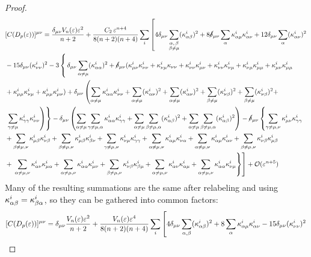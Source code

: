 \documentclass[letterpaper, reqno, 11pt]{amsart}
\theoremstyle{definition}
\theoremstyle{remark}
\numberwithin{equation}{section}
\begin{document}
\begin{proof}
\begin{align*}
& [C(D_p(\varepsilon))]^{\mu\nu} =\frac{ \delta_{\mu\nu}V_n(\varepsilon)\varepsilon^2}{n+2} + \frac{C_2\,\varepsilon^{n+4}}{8(n+2)(n+4)} \sum_{i}\left[4\delta_{\mu\nu}\sum_{\substack{\alpha,\,\beta \\ \beta\neq\mu}}(\kappa^i_{\alpha\beta})^2 + 8\cancel{\delta}_{\mu\nu}\sum_{\alpha}\kappa^i_{\alpha\mu}\kappa^i_{\alpha\nu} + 12\delta_{\mu\nu}\sum_{\alpha}(\kappa^i_{\alpha\nu})^2  \right. \\
& -15\delta_{\mu\nu}(\kappa^i_{\nu\nu})^2 -3\left\{\,\delta_{\mu\nu}\sum_{\alpha\neq\mu}(\kappa^i_{\alpha\alpha})^2 +\cancel{\delta}_{\mu\nu}( \kappa^i_{\mu\nu}\kappa^i_{\nu\nu} + \kappa^i_{\nu\mu}\kappa_{\nu\nu}+\kappa^i_{\nu\nu}\kappa^i_{\mu\nu} + \kappa^i_{\nu\nu}\kappa^i_{\nu\mu} + \kappa^i_{\nu\mu}\kappa^i_{\mu\mu} + \kappa^i_{\mu\nu}\kappa^i_{\mu\mu} \right. \\
& + \kappa^i_{\mu\mu}\kappa^i_{\nu\mu} + \kappa^i_{\mu\mu}\kappa^i_{\mu\nu} ) +\delta_{\mu\nu}\left( \sum_{\alpha\neq\mu}\kappa^i_{\alpha\alpha}\kappa^i_{\nu\nu} + \sum_{\alpha\neq\mu}(\kappa^i_{\alpha\nu})^2 +\sum_{\alpha\neq\mu}(\kappa^i_{\alpha\nu})^2 + \sum_{\beta\neq\mu}(\kappa^i_{\nu\beta})^2 + \sum_{\beta\neq\mu}(\kappa^i_{\nu\beta})^2+ \right. \\
& \left.\left. \sum_{\gamma\neq\mu}\kappa^i_{\gamma\gamma}\kappa^i_{\nu\nu}\right)\right\} - \delta_{\mu\nu}\left( \sum_{\alpha\neq\mu}\sum_{\gamma\neq\mu,\alpha}\kappa^i_{\alpha\alpha}\kappa^i_{\gamma\gamma} + \sum_{\alpha\neq\mu}\sum_{\beta\neq\mu,\alpha}(\kappa^i_{\alpha\beta})^2 + \sum_{\alpha\neq\mu}\sum_{\beta\neq\mu,\alpha}(\kappa^i_{\alpha\beta})^2  \right) - \cancel{\delta}_{\mu\nu}\left\{ \sum_{\gamma\neq\mu,\nu}\kappa^i_{\mu\nu}\kappa^i_{\gamma\gamma} \right. \\
& +\sum_{\beta\neq\mu,\nu}\kappa^i_{\mu\beta}\kappa^i_{\nu\beta} + \sum_{\beta\neq\mu,\nu}\kappa^i_{\mu\beta}\kappa^i_{\beta\nu} + \sum_{\gamma\neq\mu,\nu}\kappa^i_{\nu\mu}\kappa^i_{\gamma\gamma} + \sum_{\alpha\neq\mu,\nu}\kappa^i_{\alpha\mu}\kappa^i_{\nu\alpha}+ \sum_{\alpha\neq\mu,\nu}\kappa^i_{\alpha\mu}\kappa^i_{\alpha\nu} +\sum_{\beta\neq\mu,\nu}\kappa^i_{\nu\beta}\kappa^i_{\mu\beta} \\
& +\left.\left. \sum_{\alpha\neq\mu,\nu}\kappa^i_{\alpha\nu}\kappa^i_{\mu\alpha} + \sum_{\alpha\neq\mu,\nu}\kappa^i_{\alpha\alpha}\kappa^i_{\mu\nu} + \sum_{\beta\neq\mu,\nu}\kappa^i_{\nu\beta}\kappa^i_{\beta\mu} + \sum_{\alpha\neq\mu,\nu}\kappa^i_{\alpha\nu}\kappa^i_{\alpha\mu} + \sum_{\alpha\neq\mu,\nu}\kappa^i_{\alpha\alpha}\kappa^i_{\nu\mu}\right\}\right] + {\mathcal O}(\varepsilon^{n+5})
\end{align*}
Many of the resulting summations are the same after relabeling and using $\kappa^i_{\alpha\beta}=\kappa^i_{\beta\alpha}$, so they can be gathered into common factors:
\begin{align*}
& [C(D_p(\vep))]^{\mu\nu} = \del_{\mu\nu}\frac{V_n(\vep)\vep^2}{n+2} + \frac{V_n(\vep)\vep^{4}}{8(n+2)(n+4)} \sum_{i}\left[ 4\del_{\mu\nu}\sum_{\al,\bet}(\ka^i_{\al\bet})^2 + 8\sum_{\al}\ka^i_{\al\mu}\ka^i_{\al\nu} - 15\del_{\mu\nu}(\ka^i_{\nu\nu})^2  \right. \\

\end{align*}
\end{proof}
\end{document}
